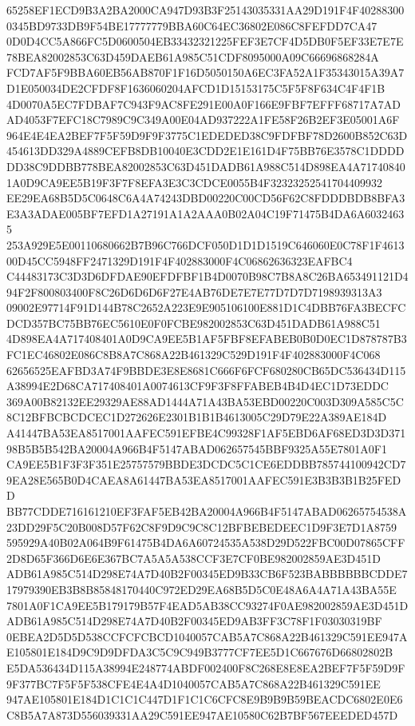 \documentclass[UTF8,fontset=fandol,zihao=-4,a4paper]{ctexart}
\begin{document}
{{65258EF1ECD9B3A2BA2000CA947D93B3F25143035331AA29D191F4F402883000345BD9733DB9F54BE17777779BBA60C64EC36802E086C8FEFDD7CA47
0D0D4CC5A866FC5D0600504EB33432321225FEF3E7CF4D5DB0F5EF33E7E7E78BEA82002853C63D459DAEB61A985C51CDF8095000A09C66696868284A
FCD7AF5F9BBA60EB56AB870F1F16D5050150A6EC3FA52A1F35343015A39A7D1E050034DE2CFDF8F1636060204AFCD1D15153175C5F5F8F634C4F4F1B
4D0070A5EC7FDBAF7C943F9AC8FE291E00A0F166E9FBF7EFFF68717A7ADAD4053F7EFC18C7989C9C349A00E04AD937222A1FE58F26B2EF3E05001A6F
964E4E4EA2BEF7F5F59D9F9F3775C1EDEDED38C9FDFBF78D2600B852C63D454613DD329A4889CEFB8DB10040E3CDD2E1E161D4F75BB76E3578C1DDDD
DD38C9DDBB778BEA82002853C63D451DADB61A988C514D898EA4A717408401A0D9CA9EE5B19F3F7F8EFA3E3C3CDCE0055B4F32323252541704409932
EE29EA68B5D5C0648C6A4A74243DBD00220C00CD56F62C8FDDDBDB8BFA3E3A3ADAE005BF7EFD1A27191A1A2AAA0B02A04C19F71475B4DA6A60324635
253A929E5E00110680662B7B96C766DCF050D1D1D1519C646060E0C78F1F461300D45CC5948FF2471329D191F4F402883000F4C06862636323EAFBC4
C44483173C3D3D6DFDAE90EFDFBF1B4D0070B98C7B8A8C26BA653491121D494F2F800803400F8C26D6D6D6F27E4AB76DE7E7E77D7D7D7198939313A3
09002E97714F91D144B78C2652A223E9E905106100E881D1C4DBB76FA3BECFCDCD357BC75BB76EC5610E0F0FCBE982002853C63D451DADB61A988C51
4D898EA4A717408401A0D9CA9EE5B1AF5FBF8EFABEB0B0D0EC1D878787B3FC1EC46802E086C8B8A7C868A22B461329C529D191F4F402883000F4C068
62656525EAFBD3A74F9BBDE3E8E8681C666F6FCF680280CB65DC536434D115A38994E2D68CA717408401A0074613CF9F3F8FFABEB4B4D4EC1D73EDDC
369A00B82132EE29329AE88AD1444A71A43BA53EBD00220C003D309A585C5C8C12BFBCBCDCEC1D272626E2301B1B1B4613005C29D79E22A389AE184D
A41447BA53EA8517001AAFEC591EFBE4C99328F1AF5EBD6AF68ED3D3D37198B5B5B542BA20004A966B4F5147ABAD062657545BBF9325A55E7801A0F1
CA9EE5B1F3F3F351E25757579BBDE3DCDC5C1CE6EDDBB785744100942CD79EA28E565B0D4CAEA8A61447BA53EA8517001AAFEC591E3B3B3B1B25FEDD
BB77CDDE716161210EF3FAF5EB42BA20004A966B4F5147ABAD06265754538A23DD29F5C20B008D57F62C8F9D9C9C8C12BFBEBEDEEC1D9F3E7D1A8759
595929A40B02A064B9F61475B4DA6A60724535A538D29D522FBC00D07865CFF2D8D65F366D6E6E367BC7A5A5A538CCF3E7CF0BE982002859AE3D451D
ADB61A985C514D298E74A7D40B2F00345ED9B33CB6F523BABBBBBBCDDE717979390EB3B8B85848170440C972ED29EA68B5D5C0E48A6A4A71A43BA55E
7801A0F1CA9EE5B179179B57F4EAD5AB38CC93274F0AE982002859AE3D451DADB61A985C514D298E74A7D40B2F00345ED9AB3FF3C78F1F03030319BF
0EBEA2D5D5D538CCFCFCBCD1040057CAB5A7C868A22B461329C591EE947AE105801E184D9C9D9DFDA3C5C9C949B3777CF7EE5D1C667676D66802802B
E5DA536434D115A38994E248774ABDF002400F8C268E8E8EA2BEF7F5F59D9F9F377BC7F5F5F538CFE4E4A4D1040057CAB5A7C868A22B461329C591EE
947AE105801E184D1C1C1C447D1F1C1C6CFC8E9B9B9B59BEACDC6802E0E6C8B5A7A873D556039331AA29C591EE947AE10580C62B7BF567EEEDED457D
}}
\end{document}
